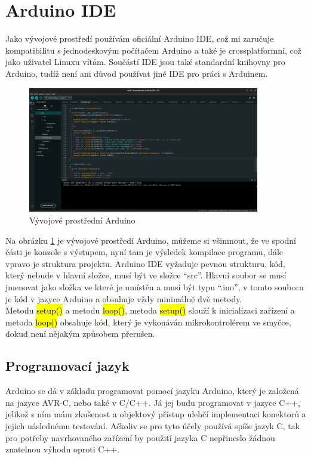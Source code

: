 
\section{Arduino IDE}
Jako vývojové prostředí používám oficiální Arduino IDE, což mi zaručuje kompatibilitu s jednodeskovým počítačem Arduino a také je crossplatformní, což jako uživatel Linuxu vítám. Součástí IDE jsou také standardní knihovny pro Arduino, tudíž není ani důvod používat jiné IDE pro práci s Arduinem.

\begin{figure}[H]
	\centering
	\includegraphics[width=0.9\textwidth]{pictures/arduinoIDE.png}
    	\caption{Vývojové prostřední Arduino}
   	\label{fig:arduinoIDE}
\end{figure}

Na obrázku \ref{fig:arduinoIDE} je vývojové prostředí Arduino, můžeme si všimnout, že ve spodní části je konzole s výstupem, nyní tam je výsledek kompilace programu, dále vpravo je struktura projektu. Arduino IDE vyžaduje pevnou strukturu, kód, který nebude v hlavní složce, musí být ve složce “src”. Hlavní soubor se musí jmenovat jako složka ve které je umístěn a musí být typu “.ino”, v tomto souboru je kód v jazyce Arduino a obsahuje vždy minimálně dvě metody.\\
Metodu \hl{setup()} a metodu \hl{loop()}, metoda \hl{setup()} slouží k inicializaci zařízení a metoda \hl{loop()} obsahuje kód, který je vykonáván mikrokontrolérem ve smyčce, dokud není nějakým způsobem přerušen.

\subsection{Programovací jazyk}
Arduino se dá v základu programovat pomocí jazyku Arduino, který je založená na jazyce AVR-C, nebo také v C/C++. Já jej budu programovat v jazyce C++, jelikož s ním mám zkušenost a objektový přístup ulehčí implementaci konektorů a jejich následnému testování. Ačkoliv se pro tyto účely používá spíše jazyk C, tak pro potřeby navrhovaného zařízení by použití jazyka C nepřineslo žádnou znatelnou výhodu oproti C++.